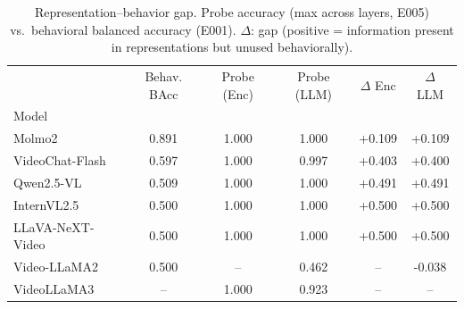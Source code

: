 \begin{table}[t]
\centering
\small
\caption{Representation--behavior gap. Probe accuracy (max across layers, E005) vs.\ behavioral balanced accuracy (E001). $\Delta$: gap (positive = information present in representations but unused behaviorally).}
\label{tab:gap}
\begin{tabular}{lccccc}
\toprule
 & Behav. BAcc & Probe (Enc) & Probe (LLM) & $\Delta$ Enc & $\Delta$ LLM \\
Model &  &  &  &  &  \\
\midrule
Molmo2 & 0.891 & 1.000 & 1.000 & +0.109 & +0.109 \\
VideoChat-Flash & 0.597 & 1.000 & 0.997 & +0.403 & +0.400 \\
Qwen2.5-VL & 0.509 & 1.000 & 1.000 & +0.491 & +0.491 \\
InternVL2.5 & 0.500 & 1.000 & 1.000 & +0.500 & +0.500 \\
LLaVA-NeXT-Video & 0.500 & 1.000 & 1.000 & +0.500 & +0.500 \\
Video-LLaMA2 & 0.500 & -- & 0.462 & -- & -0.038 \\
VideoLLaMA3 & -- & 1.000 & 0.923 & -- & -- \\
\bottomrule
\end{tabular}
\end{table}

